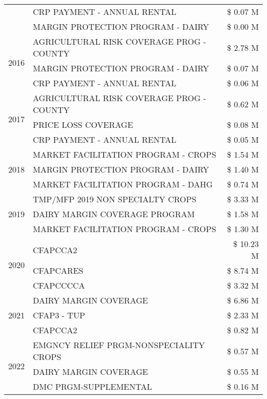 \begin{tabular}{llr}
 & CRP PAYMENT - ANNUAL RENTAL & \$ 0.07 M \\
 & MARGIN PROTECTION PROGRAM - DAIRY & \$ 0.00 M \\
\cline{1-3}
\multirow[t]{3}{*}{2016} & AGRICULTURAL RISK COVERAGE PROG - COUNTY & \$ 2.78 M \\
 & MARGIN PROTECTION PROGRAM - DAIRY & \$ 0.07 M \\
 & CRP PAYMENT - ANNUAL RENTAL & \$ 0.06 M \\
\cline{1-3}
\multirow[t]{3}{*}{2017} & AGRICULTURAL RISK COVERAGE PROG - COUNTY & \$ 0.62 M \\
 & PRICE LOSS COVERAGE & \$ 0.08 M \\
 & CRP PAYMENT - ANNUAL RENTAL & \$ 0.05 M \\
\cline{1-3}
\multirow[t]{3}{*}{2018} & MARKET FACILITATION PROGRAM - CROPS & \$ 1.54 M \\
 & MARGIN PROTECTION PROGRAM - DAIRY & \$ 1.40 M \\
 & MARKET FACILITATION PROGRAM - DAHG & \$ 0.74 M \\
\cline{1-3}
\multirow[t]{3}{*}{2019} & TMP/MFP 2019 NON SPECIALTY CROPS & \$ 3.33 M \\
 & DAIRY MARGIN COVERAGE PROGRAM & \$ 1.58 M \\
 & MARKET FACILITATION PROGRAM - CROPS & \$ 1.30 M \\
\cline{1-3}
\multirow[t]{3}{*}{2020} & CFAPCCA2 & \$ 10.23 M \\
 & CFAPCARES & \$ 8.74 M \\
 & CFAPCCCCA & \$ 3.32 M \\
\cline{1-3}
\multirow[t]{3}{*}{2021} & DAIRY MARGIN COVERAGE & \$ 6.86 M \\
 & CFAP3 - TUP & \$ 2.33 M \\
 & CFAPCCA2 & \$ 0.82 M \\
\cline{1-3}
\multirow[t]{3}{*}{2022} & EMGNCY RELIEF PRGM-NONSPECIALITY CROPS & \$ 0.57 M \\
 & DAIRY MARGIN COVERAGE & \$ 0.55 M \\
 & DMC PRGM-SUPPLEMENTAL & \$ 0.16 M \\
\cline{1-3}
\bottomrule
\end{tabular}
